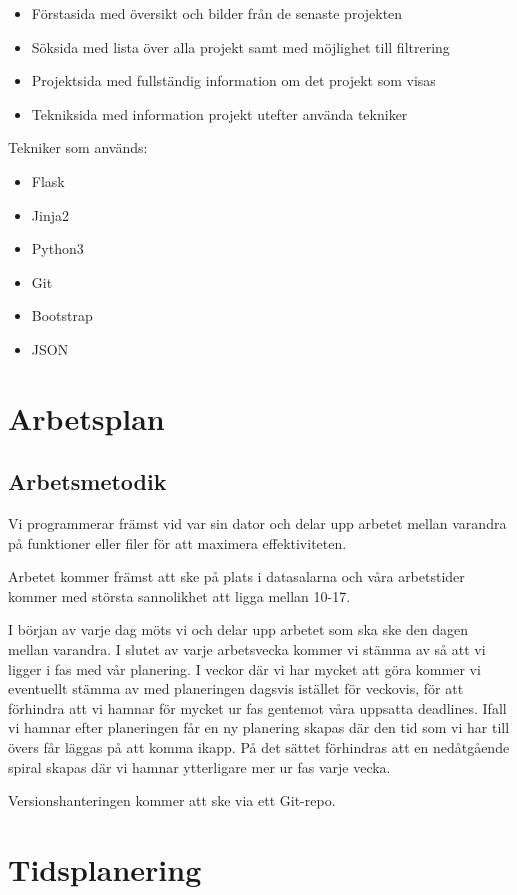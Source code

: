 \documentclass{TDP003mall}
\begin{document}
\begin{itemize}
\item Förstasida med översikt och bilder från de senaste projekten
\item Söksida med lista över alla projekt samt med möjlighet till filtrering
\item Projektsida med fullständig information om det projekt som visas
\item Tekniksida med information projekt utefter använda tekniker
\end{itemize}
\newpage
Tekniker som används:
\begin{itemize}
\item Flask
\item Jinja2
\item Python3
\item Git
\item Bootstrap
\item JSON
\end{itemize}

\section{Arbetsplan}

\subsection{Arbetsmetodik}
Vi programmerar främst vid var sin dator och delar upp arbetet mellan
varandra på funktioner eller filer för att maximera effektiviteten.

Arbetet kommer främst att ske på plats i datasalarna och våra arbetstider
kommer med största sannolikhet att ligga mellan 10-17.

I början av varje dag möts vi och delar upp arbetet som ska ske den dagen
mellan varandra.
I slutet av varje arbetsvecka kommer vi stämma av så att vi ligger i fas med
vår planering. I veckor där vi har mycket att göra kommer vi eventuellt
stämma av med planeringen dagsvis istället för veckovis, för att förhindra
att vi hamnar för mycket ur fas gentemot våra uppsatta deadlines. Ifall vi
hamnar efter planeringen får en ny planering skapas där den tid som vi har
till övers får läggas på att komma ikapp. På det sättet förhindras att
en nedåtgående spiral skapas där vi hamnar ytterligare mer ur fas varje vecka.

Versionshanteringen kommer att ske via ett Git-repo.
\newpage
\section{Tidsplanering}
\end{document}
